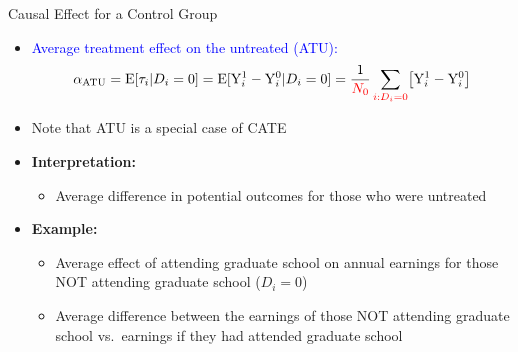 \documentclass[hyperref={pdfpagelabels=false}]{beamer}
\begin{document}
\begin{frame}{Causal Effect for a Control Group}
\begin{itemize}
  \item \textcolor{blue}{Average treatment effect on the untreated (ATU):}
  \begin{equation*}
    \alpha_{\text{ATU}} = \mathrm{E}[\tau_i|D_i=0]
    = \mathrm{E}[\mathrm{Y}^{1}_{i}-\mathrm{Y}^{0}_{i}|D_i=0]
    = \dfrac{1}{\color{red}N_0} \sum_{\color{red}i:D_i=0}\bigl[\mathrm{Y}^{1}_{i}-\mathrm{Y}^{0}_{i}\bigr]
  \end{equation*}

  \item Note that ATU is a special case of CATE
  \vspace{0.2cm}

  \item \textbf{Interpretation:}
  \begin{itemize}
    \item Average difference in potential outcomes for those who were untreated
  \end{itemize}
  \vspace{0.2cm}

  \item \textbf{Example:}
  \begin{itemize}
    \item Average effect of attending graduate school on annual earnings for those NOT attending graduate school ($D_i=0$)
    \vspace{0.2cm}
    \item Average difference between the earnings of those NOT attending graduate school vs.\ earnings if they had attended graduate school
  \end{itemize}
\end{itemize}
\end{frame}
\end{document}
